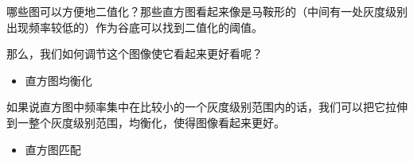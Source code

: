 \documentclass[
]{article}
\begin{document}
\begin{itemize}
\begin{itemize}
    哪些图可以方便地二值化？那些直方图看起来像是马鞍形的（中间有一处灰度级别出现频率较低的）作为谷底可以找到二值化的阈值。

    那么，我们如何调节这个图像使它看起来更好看呢？

    \begin{itemize}
    \item
      直方图均衡化
    \end{itemize}

    如果说直方图中频率集中在比较小的一个灰度级别范围内的话，我们可以把它拉伸到一整个灰度级别范围，均衡化，使得图像看起来更好。

    \begin{itemize}
    \item
      直方图匹配
    \end{itemize}
  \end{itemize}
\end{itemize}
\end{document}
